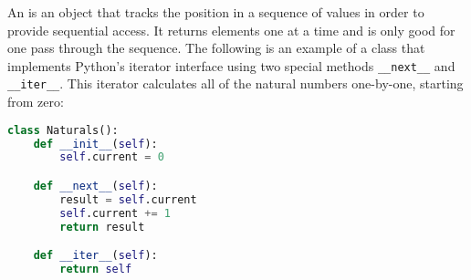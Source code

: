 An  is an object that tracks the position in a sequence of
values in order to provide sequential access. It returns elements one at a
time and is only good for one pass through the sequence. The following is an
example of a class that implements Python's iterator interface using two
special methods \lstinline$__next__$ and \lstinline$__iter__$. This iterator
calculates all of the natural numbers one-by-one, starting from zero:

\vspace{0.5em}
\begin{lstlisting}[language=Python]
class Naturals():
    def __init__(self):
        self.current = 0

    def __next__(self):
        result = self.current
        self.current += 1
        return result

    def __iter__(self):
        return self
\end{lstlisting}
\vspace{0.5em}
